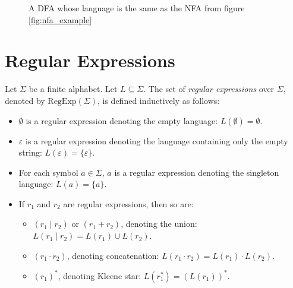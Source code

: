 \begin{figure}[H]
\centering
{}
\caption{A DFA whose language is the same as the NFA from figure \ref{fig:nfa_example}} 
\end{figure}

\section{Regular Expressions}
Let $\Sigma$ be a finite alphabet. Let $L \subseteq \Sigma$. The set of \emph{regular expressions} over $\Sigma$, denoted by $\text{RegExp}(\Sigma)$, is defined inductively as follows:

\begin{itemize}
    \item $\emptyset$ is a regular expression denoting the empty language: $L(\emptyset) = \emptyset$.
    \item $\varepsilon$ is a regular expression denoting the language containing only the empty string: $L(\varepsilon) = \{ \varepsilon \}$.
    \item For each symbol $a \in \Sigma$, $a$ is a regular expression denoting the singleton language: $L(a) = \{ a \}$.
    \item If $r_1$ and $r_2$ are regular expressions, then so are:
    \begin{itemize}
        \item $(r_1 \mid r_2)$ or $(r_1 + r_2)$, denoting the union: $L(r_1 \mid r_2) = L(r_1) \cup L(r_2)$.
        \item $(r_1 \cdot r_2)$, denoting concatenation: $L(r_1 \cdot r_2) = L(r_1) \cdot L(r_2)$.
        \item $(r_1)^*$, denoting Kleene star: $L(r_1^*) = (L(r_1))^*$.
    \end{itemize}
\end{itemize}

